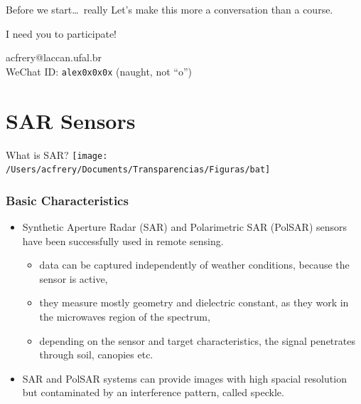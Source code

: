 \documentclass{beamer}
\begin{document}
\begin{frame}{Before we start\dots\ really}
Let's make this more a conversation than a course.

I need you to participate!

acfrery@laccan.ufal.br\\
WeChat ID: \texttt{alex0x0x0x} (naught, not ``o'')
\end{frame}

\section{SAR Sensors}

\begin{frame}{What is SAR?}
	\centering
	\texttt{[image: /Users/acfrery/Documents/Transparencias/Figuras/bat]}
\end{frame}

\begin{frame}
	\frametitle{Basic Characteristics}
	\begin{itemize}%
		
		\item Synthetic Aperture Radar (SAR) and Polarimetric SAR (PolSAR) sensors have been successfully used  in remote sensing.
		\begin{itemize}
			\item data can be captured independently of weather conditions, because the sensor is active, 
			\item they measure mostly geometry and dielectric constant, as they work in the microwaves region of the spectrum,
			\item depending on the sensor and target characteristics, the signal penetrates through soil, canopies etc.
		\end{itemize}
		
		\item SAR and PolSAR systems can provide images with high spacial resolution but contaminated by an interference pattern, called \alert{speckle}. 
	\end{itemize}
\end{frame}
\end{document}
